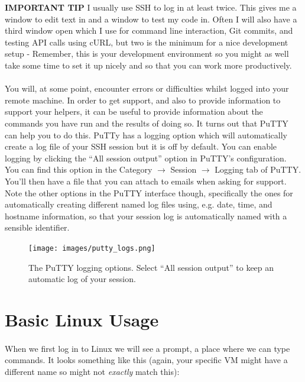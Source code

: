 \documentclass[12pt, a4paper, oneside]{book}
\begin{document}
\begin{framed}
\textbf{IMPORTANT TIP} I usually use SSH to log in at least twice. This gives me a window to edit text in and a window to test my code in. Often I will also have a third window open which I use for command line interaction, Git commits, and testing API calls using cURL, but two is the minimum for a nice development setup - Remember, this is your development environment so you might as well take some time to set it up nicely and so that you can work more productively.
\end{framed}

\paragraph{} You will, at some point, encounter errors or difficulties whilst logged into your remote machine. In order to get support, and also to provide information to support your helpers, it can be useful to provide information about the commands you have run and the results of doing so. It turns out that PuTTY can help you to do this. PuTTy has a logging option which will automatically create a log file of your SSH session but it is off by default. You can enable logging by clicking the ``All session output'' option in PuTTY's configuration. You can find this option in the Category $\to$ Session $\to$ Logging tab of PuTTY. You'll then have a file that you can attach to emails when asking for support. Note the other options in the PuTTY interface though, specifically the ones for automatically creating different named log files using, e.g. date, time, and hostname information, so that your session log is automatically named with a sensible identifier.

\begin{figure}[H]
\centering
\texttt{[image: images/putty\_logs.png]}
\caption{The PuTTY logging options. Select ``All session output'' to keep an automatic log of your session.}
\label{fig:putty-logging-options}
\end{figure}



\section{Basic Linux Usage}
\label{linux}

\paragraph{} When we first log in to Linux we will see a prompt, a place where we can type commands. It looks something like this (again, your specific VM might have a different name so might not \emph{exactly} match this):
\end{document}
